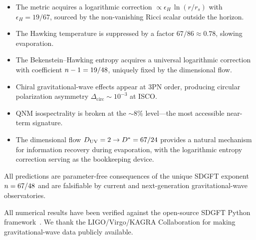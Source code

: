 \documentclass[amsmath,amssymb,aps,prd,twocolumn,superscriptaddress,nofootinbib]{revtex4-2}
\begin{document}
\begin{itemize}
  \item The metric acquires a logarithmic correction
    $\propto \epsilon_H\,\ln(r/r_s)$ with $\epsilon_H = 19/67$,
    sourced by the non-vanishing Ricci scalar outside the horizon.

  \item The Hawking temperature is suppressed by a factor
    $67/86 \approx 0.78$, slowing evaporation.

  \item The Bekenstein--Hawking entropy acquires a universal
    logarithmic correction with coefficient $n - 1 = 19/48$,
    uniquely fixed by the dimensional flow.

  \item Chiral gravitational-wave effects appear at 3PN order,
    producing circular polarization asymmetry
    $\Delta_{\mathrm{circ}} \sim 10^{-3}$ at ISCO.

  \item QNM isospectrality is broken at the $\sim 8\%$ level---the
    most accessible near-term signature.

  \item The dimensional flow $D_{\mathrm{UV}} = 2 \to D^{*} = 67/24$
    provides a natural mechanism for information recovery during
    evaporation, with the logarithmic entropy correction serving as
    the bookkeeping device.
\end{itemize}

All predictions are parameter-free consequences of the unique
SDGFT exponent $n = 67/48$ and are falsifiable by current and
next-generation gravitational-wave observatories.

\begin{acknowledgments}
All numerical results have been verified against the open-source
SDGFT Python framework~\cite{Besemer_Code}.  We thank the
LIGO/Virgo/KAGRA Collaboration for making gravitational-wave data
publicly available.
\end{acknowledgments}

\end{document}
